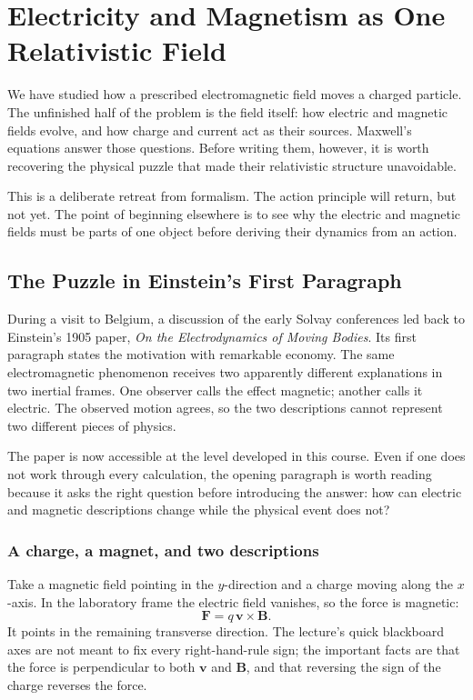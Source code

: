 \chapter{Electricity and Magnetism as One Relativistic Field}

We have studied how a prescribed electromagnetic field moves a charged
particle.  The unfinished half of the problem is the field itself: how
electric and magnetic fields evolve, and how charge and current act as their
sources.  Maxwell's equations answer those questions.  Before writing them,
however, it is worth recovering the physical puzzle that made their
relativistic structure unavoidable.

This is a deliberate retreat from formalism.  The action principle will
return, but not yet.  The point of beginning elsewhere is to see why the
electric and magnetic fields must be parts of one object before deriving
their dynamics from an action.

\section{The Puzzle in Einstein's First Paragraph}

During a visit to Belgium, a discussion of the early Solvay conferences led
back to Einstein's 1905 paper, \emph{On the Electrodynamics of Moving
Bodies}.  Its first paragraph states the motivation with remarkable
economy.  The same electromagnetic phenomenon receives two apparently
different explanations in two inertial frames.  One observer calls the
effect magnetic; another calls it electric.  The observed motion agrees, so
the two descriptions cannot represent two different pieces of physics.

The paper is now accessible at the level developed in this course.  Even if
one does not work through every calculation, the opening paragraph is worth
reading because it asks the right question before introducing the answer:
how can electric and magnetic descriptions change while the physical event
does not?

\subsection{A charge, a magnet, and two descriptions}

Take a magnetic field pointing in the \(y\)-direction and a charge moving
along the \(x\)-axis.  In the laboratory frame the electric field vanishes,
so the force is magnetic:
\begin{equation}
\mathbf F=q\,\mathbf v\times\mathbf B.
\end{equation}
It points in the remaining transverse direction.  The lecture's quick
blackboard axes are not meant to fix every right-hand-rule sign; the
important facts are that the force is perpendicular to both \(\mathbf v\)
and \(\mathbf B\), and that reversing the sign of the charge reverses the
force.

